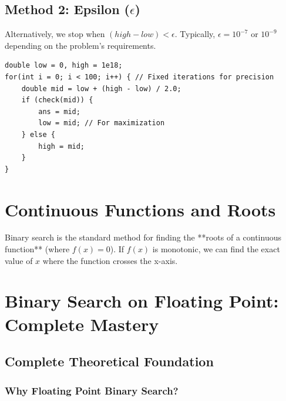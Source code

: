 \documentclass[11pt,a4paper,oneside]{book}
\begin{document}
\subsection{Method 2: Epsilon ($\epsilon$)}
Alternatively, we stop when $(high - low) < \epsilon$. Typically, $\epsilon = 10^{-7}$ or $10^{-9}$ depending on the problem's requirements.

\begin{tcolorbox}[enhanced, colback=darkgray!5!white, colframe=darkgray, title=Floating Point BS Template]
\begin{verbatim}
double low = 0, high = 1e18;
for(int i = 0; i < 100; i++) { // Fixed iterations for precision
    double mid = low + (high - low) / 2.0;
    if (check(mid)) {
        ans = mid;
        low = mid; // For maximization
    } else {
        high = mid;
    }
}
\end{verbatim}
\end{tcolorbox}

\section{Continuous Functions and Roots}
Binary search is the standard method for finding the **roots of a continuous function** (where $f(x) = 0$). If $f(x)$ is monotonic, we can find the exact value of $x$ where the function crosses the x-axis.

\section{Binary Search on Floating Point: Complete Mastery}

\subsection{Complete Theoretical Foundation}

\subsubsection{Why Floating Point Binary Search?}
\end{document}
